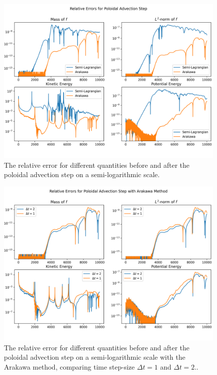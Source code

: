 \begin{figure}
	\centering
	\includegraphics[width=0.9\linewidth]{plots/rel_err_log}
	\caption{The relative error for different quantities before and after the poloidal advection step on a semi-logarithmic scale.}
	\label{fig:relerrlog}
\end{figure}

\begin{figure}
	\centering
	\includegraphics[width=0.9\linewidth]{plots/rel_err_log akw}
	\caption{The relative error for different quantities before and after the poloidal advection step on a semi-logarithmic scale with the Arakawa method, comparing time step-size $\Delta t = 1$ and $\Delta t = 2$..}
	\label{fig:relerrlog_akw}
\end{figure}



